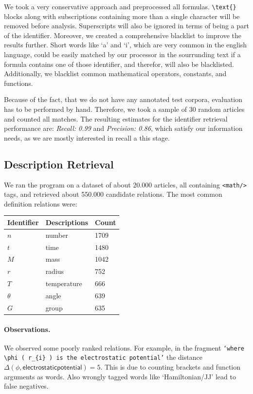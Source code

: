 \documentclass[runningheads]{llncs}
\begin{document}
We took a very conservative approach and preprocessed all formulas.
\texttt{\textbackslash text\{\}} blocks along with subscriptions containing
more than a single character will be removed before analysis. Superscripts
will also be ignored in terms of being a part of the identifier. Moreover, we
created a comprehensive blacklist to improve the results further. Short words
like `a' and `i', which are very common in the english language, could be
easily matched by our processor in the sourrunding text if a formula contains
one of those identifier, and therefor, will also be blacklisted. Additionally,
we blacklist common mathematical operators, constants, and functions.

Because of the fact, that we do not have any annotated test corpora,
evaluation has to be performed by hand. Therefore, we took a sample of 30
random articles and counted all matches. The resulting estimates for the
identifier retrieval performance are: \emph{Recall: 0.99} and \emph{Precision:
0.86}, which satisfy our information needs, as we are mostly interested in recall
a this stage.


\subsection{Description Retrieval}

We ran the program on a dataset of about 20.000 articles, all containing
\texttt{<math/>} tags, and retrieved about 550.000 candidate relations. The
most common definition relations were:


\begin{tabular}{| l | p{6.8cm} | l |}
	\hline
	Identifier & Descriptions & Count\\
	\hline
	$n$ & number & 1709 \\
	$t$ & time & 1480 \\
	$M$ & mass & 1042 \\
	$r$ & radius & 752 \\
	$T$ & temperature & 666 \\
	$\theta$ & angle & 639 \\
	$G$ & group & 635 \\
	\hline
\end{tabular}

\paragraph{Observations.} We observed some poorly ranked relations. For
example, in the fragment \texttt{`where $\phi$ ( $r_{i}$ ) is the electrostatic
potential'} the distance
$\Delta(\phi, \mathsf{electrostatic potential} ) = 5$. This is due
to counting brackets and function arguments as words. Also wrongly tagged
words like `Hamiltonian/JJ' lead to false negatives.
\end{document}
